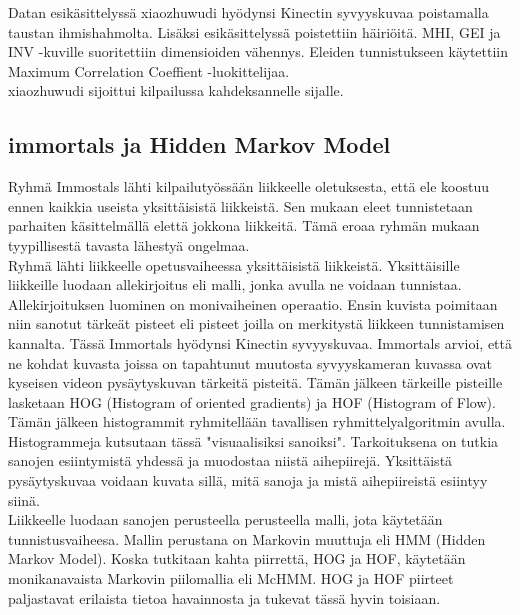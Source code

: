 Datan esikäsittelyssä xiaozhuwudi hyödynsi Kinectin syvyyskuvaa poistamalla taustan ihmishahmolta. Lisäksi esikäsittelyssä poistettiin häiriöitä.
MHI, GEI ja INV -kuville suoritettiin dimensioiden vähennys. Eleiden tunnistukseen käytettiin Maximum Correlation Coeffient -luokittelijaa. \citep {6239179}\\

xiaozhuwudi sijoittui kilpailussa kahdeksannelle sijalle. 



\subsection{immortals ja Hidden Markov Model}

Ryhmä Immostals lähti kilpailutyössään liikkeelle oletuksesta, että ele koostuu ennen kaikkia useista yksittäisistä liikkeistä. 
Sen mukaan eleet tunnistetaan parhaiten käsittelmällä elettä jokkona liikkeitä. Tämä eroaa ryhmän mukaan tyypillisestä 
tavasta lähestyä ongelmaa.\\

Ryhmä lähti liikkeelle opetusvaiheessa yksittäisistä liikkeistä. Yksittäisille liikkeille luodaan allekirjoitus eli malli,
jonka avulla ne voidaan tunnistaa. Allekirjoituksen luominen on monivaiheinen operaatio. Ensin kuvista poimitaan niin sanotut
tärkeät pisteet eli pisteet joilla on merkitystä liikkeen tunnistamisen kannalta. Tässä Immortals hyödynsi Kinectin syvyyskuvaa.
Immortals arvioi, että ne kohdat kuvasta joissa on tapahtunut muutosta syvyyskameran kuvassa ovat kyseisen videon pysäytyskuvan
tärkeitä pisteitä. Tämän jälkeen tärkeille pisteille lasketaan HOG (Histogram of oriented gradients) ja HOF (Histogram of Flow). 
Tämän jälkeen histogrammit ryhmitellään tavallisen ryhmittelyalgoritmin avulla.
Histogrammeja kutsutaan tässä "visuaalisiksi sanoiksi". Tarkoituksena on tutkia sanojen esiintymistä yhdessä ja muodostaa niistä aihepiirejä. 
Yksittäistä pysäytyskuvaa voidaan kuvata sillä, mitä sanoja ja mistä aihepiireistä esiintyy siinä.\\

Liikkeelle luodaan sanojen perusteella perusteella malli, jota käytetään tunnistusvaiheesa. Mallin perustana on Markovin muuttuja
eli HMM (Hidden Markov Model). Koska tutkitaan kahta piirrettä, HOG ja HOF, käytetään monikanavaista Markovin piilomallia eli McHMM. 
HOG ja HOF piirteet paljastavat erilaista tietoa havainnosta ja tukevat tässä hyvin toisiaan.\\

